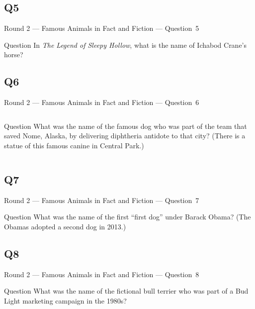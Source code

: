 \documentclass[11pt]{beamer}
\begin{document}
\subsection*{Q5}
\begin{frame}[t]{Round 2 --- Famous Animals in Fact and Fiction --- \mbox{Question 5}}
\vspace{-0.5em}
\begin{block}{Question}
In \emph{The Legend of Sleepy Hollow}, what is the name of Ichabod Crane's horse?
\end{block}
\end{frame}
\subsection*{Q6}
\begin{frame}[t]{Round 2 --- Famous Animals in Fact and Fiction --- \mbox{Question 6}}
\vspace{-0.5em}
\begin{columns}[T,totalwidth=\linewidth]
\begin{column}{0.32\linewidth}
\begin{block}{Question}
What was the name of the famous dog who was part of the team that saved Nome, Alaska, by delivering diphtheria antidote to that city? (There is a statue of this famous canine in Central Park.)
\end{block}
\end{column}
\begin{column}{0.65\linewidth}
\begin{center}
\texttt{[image: \{Images/balto]}.JPG}
\end{center}
\end{column}
\end{columns}
\end{frame}
\subsection*{Q7}
\begin{frame}[t]{Round 2 --- Famous Animals in Fact and Fiction --- \mbox{Question 7}}
\vspace{-0.5em}
\begin{block}{Question}
What was the name of the first ``first dog'' under Barack Obama? (The Obamas adopted a second dog in 2013.)
\end{block}
\end{frame}
\subsection*{Q8}
\begin{frame}[t]{Round 2 --- Famous Animals in Fact and Fiction --- \mbox{Question 8}}
\vspace{-0.5em}
\begin{block}{Question}
What was the name of the fictional bull terrier who was part of a Bud Light marketing campaign in the 1980s?
\end{block}
\end{frame}
\end{document}
